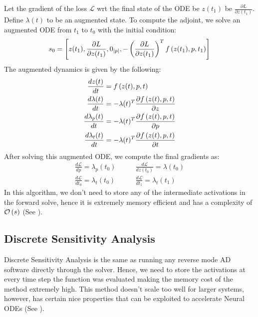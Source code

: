 Let the gradient of the loss $\mathcal{L}$ wrt the final state of the ODE be $z(t_1)$ be $\frac{\partial L}{\partial z(t_1)}$. Define $\lambda(t)$ to be an augmented state. To compute the adjoint, we solve an augmented ODE from $t_1$ to $t_0$ with the initial condition:
%
\begin{equation}
    s_0 = \left[ z(t_1), \frac{\partial L}{\partial z(t_1)}, 0_{|p|}, -\left(\frac{\partial L}{\partial z(t_1)}\right)^T f\left(z(t_1), p, t_1\right)\right]
\end{equation}
%
The augmented dynamics is given by the following:
%
\begin{align}
    \frac{dz(t)}{dt} &= f\left(z(t), p, t\right)\\
    \frac{d\lambda(t)}{dt} &= -\lambda(t)^T \frac{\partial f\left(z(t), p, t\right)}{\partial z}\\
    \frac{d\lambda_p(t)}{dt} &= -\lambda(t)^T \frac{\partial f\left(z(t), p, t\right)}{\partial p}\\
    \frac{d\lambda_t(t)}{dt} &= -\lambda(t)^T \frac{\partial f\left(z(t), p, t\right)}{\partial t} 
\end{align}
%
After solving this augmented ODE, we compute the final gradients as:
%
\begin{align}
    \frac{d\mathcal{L}}{dp} = \lambda_p(t_0) &\qquad \frac{d\mathcal{L}}{dz(t_0)} = \lambda(t_0)\\
    \frac{d\mathcal{L}}{dt_0} = \lambda_t(t_0) &\qquad \frac{d\mathcal{L}}{dt_1} = \lambda_t(t_1)
\end{align}
%
In this algorithm, we don't need to store any of the intermediate activations in the forward solve, hence it is extremely memory efficient and has a complexity of $\mathcal{O}\left(s\right)$ (See ).

\subsection{Discrete Sensitivity Analysis}
\label{subsec:discrete_sensitivity_analysis_odes}

Discrete Sensitivity Analysis is the same as running any reverse mode AD software directly through the solver. Hence, we need to store the activations at every time step the function was evaluated making the memory cost of the method extremely high. This method doesn't scale too well for larger systems, however, has certain nice properties that can be exploited to accelerate Neural ODEs (See ).


